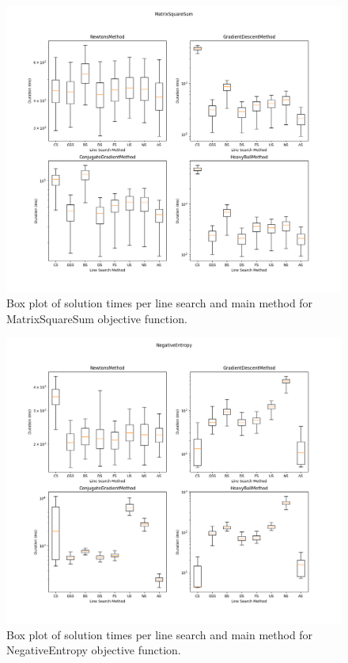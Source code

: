 \documentclass[english, 12pt, a4paper, sci, utf8, a-1b, online, table]{aaltothesis}
\begin{document}
\begin{figure}[H]
	\centering
	\includegraphics[width=1.0\textwidth]{images/boxplot_mss.png}
	\caption{Box plot of solution times per line search and main method for MatrixSquareSum objective function.}
	\label{fig:boxplot_mss}
\end{figure}


\begin{figure}[H]
	\centering
	\includegraphics[width=1.0\textwidth]{images/boxplot_ne.png}
	\caption{Box plot of solution times per line search and main method for NegativeEntropy objective function.}
	\label{fig:boxplot_ne}
\end{figure}
\end{document}
